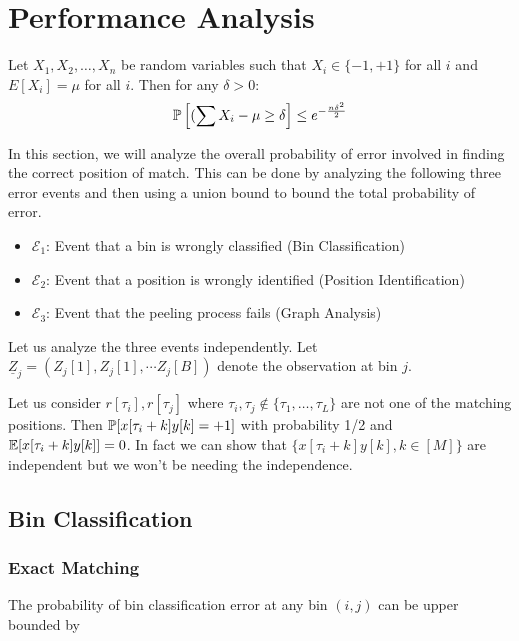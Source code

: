 \section{Performance Analysis}

\begin{lemma}
\label{Lem:Chernoff}
Let $X_1, X_2,\ldots, X_n$ be random variables such that $X_i \in\{-1, +1\}$ for all $i$ and $E[X_i]=\mu$ for all $i$. Then for any $\delta>0$:
\begin{align*}
\mathbb{P}\left[(\sum X_i-\mu\geq \delta\right]\leq e^{-\frac{n\delta^2}{2}}
\end{align*}
\end{lemma}



In this section, we will analyze the overall probability of error involved in finding the correct position of match. This can be done by analyzing the following three error events and then using a union bound to bound the total probability of error.

\begin{itemize}
	\item $\mathcal{E}_1$: Event that a bin is wrongly classified  (Bin Classification)
	\item $\mathcal{E}_2$: Event that a position is wrongly identified  (Position Identification)
	\item $\mathcal{E}_3$: Event that the peeling process fails (Graph Analysis)
\end{itemize}

Let us analyze the three events independently. Let $\underline{Z}_{j} = (Z_{j}[1], Z_{j}[1], \cdots Z_{j}[B])$ denote the observation at bin $j$. 

\begin{lemma}
\label{Lem:CorrelationCoefficient}
Let us consider $r[\tau_i],r[\tau_j]$ where $\tau_i,\tau_j \notin \{\tau_1,\ldots, \tau_L\}$ are not one of the matching positions. Then $\mathbb{P}[x[\tau_i+k]y[k]=+1]$ with probability 1/2 and $\mathbb{E}[x[\tau_i+k]y[k]]=0$. In fact we can show that $\{x[\tau_i+k]y[k],k\in[M]\}$ are independent but we won't be needing the independence.
\end{lemma}

\subsection{\bf Bin Classification}
\subsubsection*{Exact Matching}
\begin{lemma}
The probability of bin classification error at any bin $(i,j)$ can be upper bounded by
\end{lemma}

